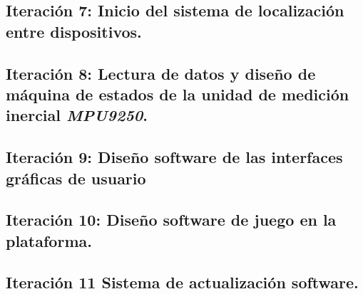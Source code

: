 \subsection{Iteración 7: Inicio del sistema de localización entre dispositivos.}

\subsection{Iteración 8: Lectura de datos y diseño de máquina de estados de la unidad de medición inercial \emph{MPU9250}.}

\subsection{Iteración 9: Diseño software de las interfaces gráficas de usuario}

\subsection{Iteración 10: Diseño software de juego en la plataforma.}


\subsection{Iteración 11 Sistema de actualización software.}
